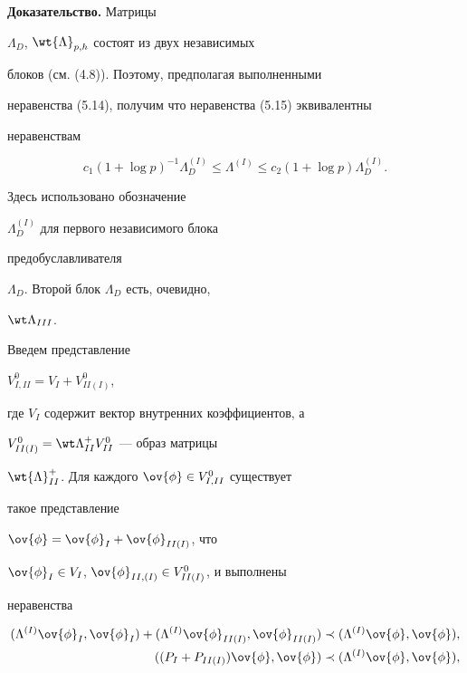 {\bf Доказательство.} Матрицы 


$\Lambda_D$, $\wt{\Lambda}_{p,h}$ состоят из двух независимых 


блоков (см. (4.8)). Поэтому, предполагая выполненными 


неравенства (5.14), получим что неравенства (5.15) эквивалентны 


неравенствам 


\begin{equation}\label{eq16}


c_1(1+\log p)^{-1}\Lambda^{(I)}_D \leq \Lambda^{(I)} \leq c_2(1+\log


p)\Lambda^{(I)}_D.


\end{equation}


Здесь использовано обозначение 


$\Lambda^{(I)}_D$ для первого независимого блока 


предобуславливателя


$\Lambda_D$. Второй блок $\Lambda_D$ есть, очевидно,


$\wt \Lambda_{III}$.


Введем представление 


$V^0_{I,II} = V_I + V^0_{II(I)}$,


где $V_I$ содержит вектор внутренних коэффициентов, а 


$V^0_{II(I)}=\wt\Lambda^+_{II}V^0_{II}$ --- образ матрицы 


$\wt{\Lambda}^+_{II}$. Для каждого $\ov{\phi} \in V^0_{I,II}$ существует 


такое представление 


$\ov{\phi}=\ov{\phi}_I + \ov{\phi}_{II(I)}$, что 


$\ov{\phi}_I \in V_I$, $\ov{\phi}_{II,(I)} \in V^0_{II(I)}$, и выполнены 


неравенства


\begin{align}


\label{eq17}


(\Lambda^{(I)}\ov{\phi}_I,\ov{\phi}_I) +


(\Lambda^{(I)}\ov{\phi}_{II(I)}, \ov{\phi}_{II(I)}) &\prec


(\Lambda^{(I)}\ov{\phi},\ov{\phi}),\\


%


\label{eq18}


((P_I + P_{II(I)})\ov{\phi},\ov{\phi}) &\prec


(\Lambda^{(I)}\ov{\phi},\ov{\phi}),


\end{align}


